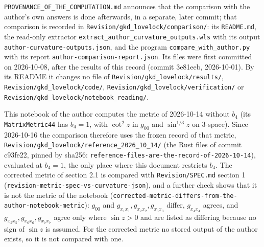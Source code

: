 \documentclass[11pt]{article}
\begin{document}
\texttt{PROVENAN\allowbreak{}CE\_OF\_TH\allowbreak{}E\_COMPUT\allowbreak{}ATION.md} announces that the comparison with the author's own answers is done afterwards, in a separate, later commit; that comparison is recorded in \texttt{Revision\allowbreak{}/gkd\_lov\allowbreak{}elock/co\allowbreak{}mparison\allowbreak{}/}: its \texttt{README.m\allowbreak{}d}, the read-only extractor \texttt{extract\_\allowbreak{}author\_c\allowbreak{}urvature\allowbreak{}\_outputs\allowbreak{}.wls} with its output \texttt{author-c\allowbreak{}urvature\allowbreak{}-outputs\allowbreak{}.json}, and the program \texttt{compare\_\allowbreak{}with\_aut\allowbreak{}hor.py} with its report \texttt{author-c\allowbreak{}ompariso\allowbreak{}n-report\allowbreak{}.json}. Its files were first committed on 2026-10-08, after the results of this record (commit 3e81eeb, 2026-10-01). By its README it changes no file of \texttt{Revision\allowbreak{}/gkd\_lov\allowbreak{}elock/re\allowbreak{}sults/}, \texttt{Revision\allowbreak{}/gkd\_lov\allowbreak{}elock/co\allowbreak{}de/}, \texttt{Revision\allowbreak{}/gkd\_lov\allowbreak{}elock/ve\allowbreak{}rificati\allowbreak{}on/} or \texttt{Revision\allowbreak{}/gkd\_lov\allowbreak{}elock/no\allowbreak{}tebook\_r\allowbreak{}eading/}.

This notebook of the author computes the metric of 2026-10-14 without $b_4$ (its \texttt{MatrixMe\allowbreak{}tric44} has $b_4 = 1$, with $\cot^2z$ in $g_{00}$ and $\sin^{1/3}z$ on 3-space). Since 2026-10-16 the comparison therefore uses the frozen record of that metric, \texttt{Revision\allowbreak{}/gkd\_lov\allowbreak{}elock/re\allowbreak{}ference\_\allowbreak{}2026\_10\_\allowbreak{}14/} (the Rust files of commit c93fe22, pinned by sha256: \texttt{referenc\allowbreak{}e-files-\allowbreak{}are-the-\allowbreak{}record-o\allowbreak{}f-2026-1\allowbreak{}0-14}), evaluated at $b_4 = 1$, the only place where this document restricts $b_4$. The corrected metric of section 2.1 is compared with \texttt{Revision\allowbreak{}/SPEC.md} section 1 (\texttt{revision\allowbreak{}-metric-\allowbreak{}spec-vs-\allowbreak{}curvatur\allowbreak{}e-json}), and a further check shows that it is not the metric of the notebook (\texttt{correcte\allowbreak{}d-metric\allowbreak{}-differs\allowbreak{}-from-th\allowbreak{}e-author\allowbreak{}-noteboo\allowbreak{}k-metric}): $g_{00}$ and $g_{x_1x_1}, g_{x_2x_2}, g_{x_3x_3}$ differ, $g_{x_4x_4}$ agrees, and $g_{x_5x_5}, g_{x_6x_6}, g_{x_7x_7}$ agree only where $\sin z > 0$ and are listed as differing because no sign of $\sin z$ is assumed. For the corrected metric no stored output of the author exists, so it is not compared with one.
\end{document}
